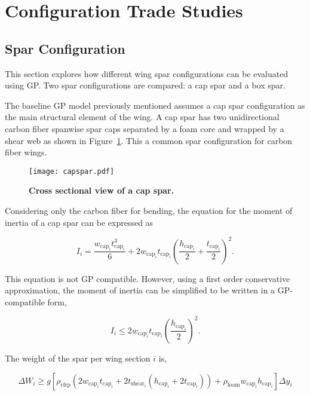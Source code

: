 \documentclass[]{aiaa-tc}%
\begin{document}
\section{Configuration Trade Studies}

\subsection{Spar Configuration}

This section explores how different wing spar configurations can be evaluated using GP. 
Two spar configurations are compared: a cap spar and a box spar.  

The baseline GP model previously mentioned assumes a cap spar configuration as the main structural element of the wing.\cite{burton_solar_2017} 
A cap spar has two unidirectional carbon fiber spanwise spar caps separated by a foam core and wrapped by a shear web as shown in Figure~\ref{f:capspar}. 
This a common spar configuration for carbon fiber wings.  


\begin{figure}[h!]
	\begin{center}
	\texttt{[image: capspar.pdf]}
    \caption{\textbf{Cross sectional view of a cap spar.}}
	\label{f:capspar}
	\end{center}
\end{figure}

Considering only the carbon fiber for bending, the equation for the moment of inertia\cite{bending} of a cap spar can be expressed as

\begin{equation}
    \label{e:moispar}
    I_i = \frac{w_{\text{cap}_i}t_{\text{cap}_i}^3}{6} + 2w_{\text{cap}_i}t_{\text{cap}_i}\left( \frac{h_{\text{cap}_i}}{2} + \frac{t_{\text{cap}_i}}{2} \right)^2.
\end{equation}

This equation is not GP compatible.  However, using a first order conservative approximation, the moment of inertia can be simplified to be written in a GP-compatible form, 

\begin{equation}
    \label{e:moispar}
    I_i \leq 2w_{\text{cap}_i}t_{\text{cap}_i}\left(\frac{h_{\text{cap}_i}}{2}\right)^2.
\end{equation}

The weight of the spar per wing section $i$ is, 

\begin{equation}
    \label{e:sparmass}
    \Delta W_i \geq g[\rho_{\text{cfrp}} (2w_{\text{cap}_i}t_{\text{cap}_i} + 2t_{\mathrm{shear}_i}(h_{\mathrm{cap}_i} + 2t_{\mathrm{cap}_i})) + \rho_{\mathrm{foam}} w_{\mathrm{cap}_i}h_{\mathrm{cap}_i} ] \Delta y_i 
\end{equation}
\end{document}
